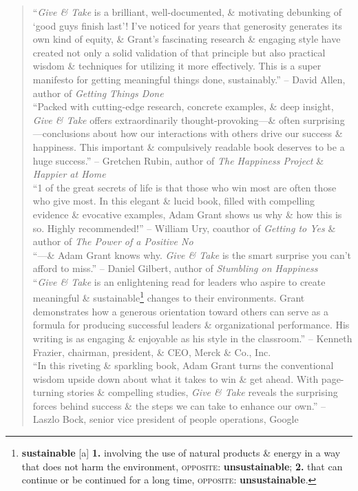 \documentclass[oneside]{book}
\numberwithin{equation}{section}
\begin{document}
\begin{quotation}
	``\textit{Give \& Take} is a brilliant, well-documented, \& motivating debunking of `good guys finish last'! I've noticed for years that generosity generates its own kind of equity, \& Grant's fascinating research \& engaging style have created not only a solid validation of that principle but also practical wisdom \& techniques for utilizing it more effectively. This is a super manifesto for getting meaningful things done, sustainably.'' -- David Allen, author of \textit{Getting Things Done}\\
	
	``Packed with cutting-edge research, concrete examples, \& deep insight, \textit{Give \& Take} offers extraordinarily thought-provoking---\& often surprising---conclusions about how our interactions with others drive our success \& happiness. This important \& compulsively readable book deserves to be a huge success.'' -- Gretchen Rubin, author of \textit{The Happiness Project} \& \textit{Happier at Home}\\
	
	``1 of the great secrets of life is that those who win most are often those who give most. In this elegant \& lucid book, filled with compelling evidence \& evocative examples, Adam Grant shows us why \& how this is so. Highly recommended!'' -- William Ury, coauthor of \textit{Getting to Yes} \& author of \textit{The Power of a Positive No}\\
	
	``---\& Adam Grant knows why. \textit{Give \& Take} is the smart surprise you can't afford to miss.'' -- Daniel Gilbert, author of \textit{Stumbling on Happiness}\\
	
	``\textit{Give \& Take} is an enlightening read for leaders who aspire to create meaningful \& sustainable\footnote{\textbf{sustainable} [a] \textbf{1.} involving the use of natural products \& energy in a way that does not harm the environment, \textsc{opposite}: \textbf{unsustainable}; \textbf{2.} that can continue or be continued for a long time, \textsc{opposite}: \textbf{unsustainable}.} changes to their environments. Grant demonstrates how a generous orientation toward others can serve as a formula for producing successful leaders \& organizational performance. His writing is as engaging \& enjoyable as his style in the classroom.'' -- Kenneth Frazier, chairman, president, \& CEO, Merck \& Co., Inc.\\
	
	``In this riveting \& sparkling book, Adam Grant turns the conventional wisdom upside down about what it takes to win \& get ahead. With page-turning stories \& compelling studies, \textit{Give \& Take} reveals the surprising forces behind success \& the steps we can take to enhance our own.'' -- Laszlo Bock, senior vice president of people operations, Google\\
	

\end{quotation}
\end{document}
